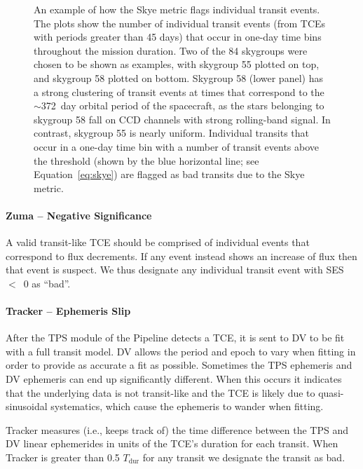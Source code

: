 \begin{figure}[ht]
\caption{An example of how the Skye metric flags individual transit events. The plots show the number of individual transit events (from TCEs with periods greater than 45 days) that occur in one-day time bins throughout the mission duration. Two of the 84 skygroups were chosen to be shown as examples, with skygroup 55 plotted on top, and skygroup 58 plotted on bottom. Skygroup 58 (lower panel) has a strong clustering of transit events at times that correspond to the $\sim$372~day orbital period of the spacecraft, as the stars belonging to skygroup 58 fall on CCD channels with strong rolling-band signal. In contrast, skygroup 55 is nearly uniform. Individual transits that occur in a one-day time bin with a number of transit events above the threshold (shown by the blue horizontal line; see Equation~\ref{eq:skye}) are flagged as bad transits due to the Skye metric.}
\label{skyefig}
\end{figure}


\paragraph{Zuma -- Negative Significance}
\label{s:zuma}

A valid transit-like TCE should be comprised of individual events that correspond to flux decrements. If any event instead shows an increase of flux then that event is suspect. We thus designate any individual transit event with SES~$<$~0 as ``bad''.


\paragraph{Tracker -- Ephemeris Slip}
\label{s:tracker}
After the TPS module of the \kepler{} Pipeline detects a TCE, it is sent to DV to be fit with a full transit model. DV allows the period and epoch to vary when fitting in order to provide as accurate a fit as possible. Sometimes the TPS ephemeris and DV ephemeris can end up significantly different. When this occurs it indicates that the underlying data is not transit-like and the TCE is likely due to quasi-sinusoidal systematics, which cause the ephemeris to wander when fitting.

Tracker measures (i.e., keeps track of) the time difference between the TPS and DV linear ephemerides in units of the TCE's duration for each transit. When Tracker is greater than  0.5 $T_{\mathrm{dur}}$ for any transit we designate the transit as bad.


